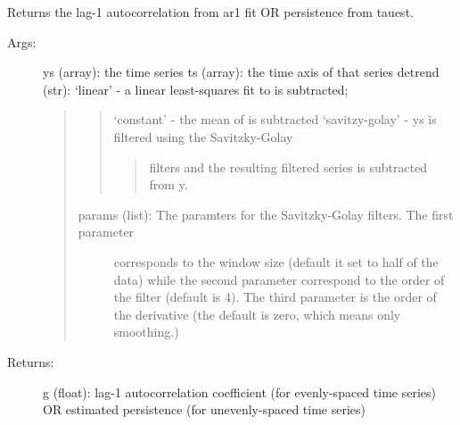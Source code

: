 \documentclass[letterpaper,10pt,english]{sphinxmanual}
\begin{document}
\begin{fulllineitems}
\label{\detokenize{Spectral:pyleoclim.Spectral.ar1_fit}}
Returns the lag-1 autocorrelation from ar1 fit OR persistence from tauest.
\begin{description}
\item[{Args:}] \leavevmode
ys (array): the time series
ts (array): the time axis of that series
detrend (str): ‘linear’ - a linear least-squares fit to  is subtracted;
\begin{quote}
\begin{quote}

‘constant’ - the mean of  is subtracted
‘savitzy-golay’ - ys is filtered using the Savitzky-Golay
\begin{quote}

filters and the resulting filtered series is subtracted from y.
\end{quote}
\end{quote}
\begin{description}
\item[{params (list): The paramters for the Savitzky-Golay filters. The first parameter}] \leavevmode
corresponds to the window size (default it set to half of the data)
while the second parameter correspond to the order of the filter
(default is 4). The third parameter is the order of the derivative
(the default is zero, which means only smoothing.)

\end{description}
\end{quote}

\item[{Returns:}] \leavevmode
g (float): lag-1 autocorrelation coefficient (for evenly-spaced time series)
OR estimated persistence (for unevenly-spaced time series)

\end{description}

\end{fulllineitems}

\end{document}
